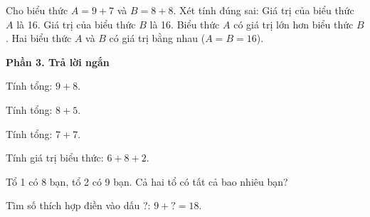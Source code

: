 \begin{ex} %
Cho biểu thức $A = 9 + 7$ và $B = 8 + 8$. Xét tính đúng sai:
\choiceTF
{\True Giá trị của biểu thức $A$ là 16.}
{\True Giá trị của biểu thức $B$ là 16.}
{Biểu thức $A$ có giá trị lớn hơn biểu thức $B$.}
{\True Hai biểu thức $A$ và $B$ có giá trị bằng nhau ($A = B = 16$).}
\end{ex}

\textbf{Phần 3. Trả lời ngắn}

\begin{ex} %
Tính tổng: $9 + 8$.
\end{ex}

\begin{ex} %
Tính tổng: $8 + 5$.
\end{ex}

\begin{ex} %
Tính tổng: $7 + 7$.
\end{ex}

\begin{ex} %
Tính giá trị biểu thức: $6 + 8 + 2$.
\end{ex}

\begin{ex} %
Tổ 1 có 8 bạn, tổ 2 có 9 bạn. Cả hai tổ có tất cả bao nhiêu bạn?
\end{ex}

\begin{ex} %
Tìm số thích hợp điền vào dấu ?: $9 + ? = 18$.
\end{ex}
